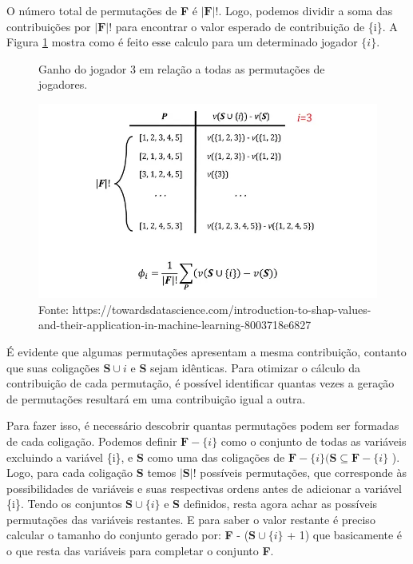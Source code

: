 O número total de permutações de \textbf{F} é $|\textbf{F}|!$. Logo, podemos dividir a soma das contribuições por $|\textbf{F}|!$ 
para encontrar o valor esperado de contribuição de \{i\}. A Figura \ref{fig:total_permuts_shap} mostra como é feito esse calculo
 para um determinado jogador $\{i\}$.

\begin{figure}[H]
    \centering
    \caption{Ganho do jogador 3 em relação a todas as permutações de jogadores.}
    \includegraphics[scale=0.5]{imagens/shap.png}
    \caption*{Fonte: https://towardsdatascience.com/introduction-to-shap-values-and-their-application-in-machine-learning-8003718e6827}
    \label{fig:total_permuts_shap}
    
\end{figure}


É evidente que algumas permutações apresentam a mesma contribuição, contanto que suas coligações $\textbf{S}\cup{i}$ e \textbf{S}
 sejam idênticas. Para otimizar o cálculo da contribuição de cada permutação, é possível identificar quantas vezes a geração de
  permutações resultará em uma contribuição igual a outra.


Para fazer isso, é necessário descobrir quantas permutações podem ser formadas de cada coligação. Podemos definir
$\textbf{F} - \{i\}$ como o conjunto de todas as variáveis excluindo a variável \{i\}, e \textbf{S} como uma das
coligações de $\textbf{F} - \{i\} (\textbf{S} \subseteq  \textbf{F} - \{i\}$ ). 
Logo, para cada coligação \textbf{S} temos $|\textbf{S}|!$ possíveis permutações, que corresponde às possibilidades
de variáveis e suas respectivas ordens antes de adicionar a variável \{i\}.
Tendo os conjuntos $\textbf{S}\cup\{i\}$ e \textbf{S} definidos, resta agora achar as possíveis permutações
das variáveis restantes. E para saber o valor restante é preciso calcular o tamanho do conjunto gerado por:
\textbf{F} - ($\textbf{S}\cup\{i\}$ + 1)
que basicamente é o que resta das variáveis para completar o conjunto \textbf{F}.

